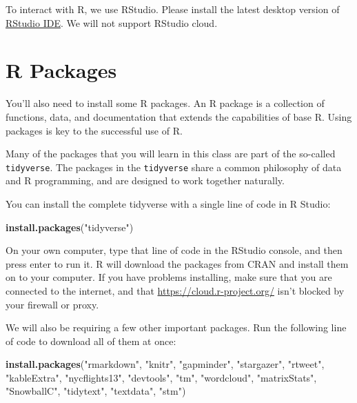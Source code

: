 \documentclass[]{book}
\newenvironment{Shaded}{\begin{snugshade}}{\end{snugshade}}
\newcommand{\KeywordTok}[1]{\textcolor[rgb]{0.13,0.29,0.53}{\textbf{#1}}}
\newcommand{\NormalTok}[1]{#1}
\newcommand{\StringTok}[1]{\textcolor[rgb]{0.31,0.60,0.02}{#1}}
\begin{document}
To interact with R, we use RStudio. Please install the latest desktop version of \href{http://www.rstudio.com/ide/download/desktop}{RStudio IDE}. We will not support RStudio cloud.

\hypertarget{r-packages}{%
\section{R Packages}\label{r-packages}}

You'll also need to install some R packages. An R package is a collection of functions, data, and documentation that extends the capabilities of base R. Using packages is key to the successful use of R.

Many of the packages that you will learn in this class are part of the so-called \texttt{tidyverse}. The packages in the \texttt{tidyverse} share a common philosophy of data and R programming, and are designed to work together naturally.

You can install the complete tidyverse with a single line of code in R Studio:

\begin{Shaded}
\begin{Highlighting}[]
\KeywordTok{install.packages}\NormalTok{(}\StringTok{"tidyverse"}\NormalTok{)}
\end{Highlighting}
\end{Shaded}

On your own computer, type that line of code in the RStudio console, and then press enter to run it. R will download the packages from CRAN and install them on to your computer. If you have problems installing, make sure that you are connected to the internet, and that \url{https://cloud.r-project.org/} isn't blocked by your firewall or proxy.

We will also be requiring a few other important packages. Run the following line of code to download all of them at once:

\begin{Shaded}
\begin{Highlighting}[]
\KeywordTok{install.packages}\NormalTok{(}\StringTok{"rmarkdown"}\NormalTok{, }\StringTok{"knitr"}\NormalTok{, }\StringTok{"gapminder"}\NormalTok{, }
                 \StringTok{"stargazer"}\NormalTok{, }\StringTok{"rtweet"}\NormalTok{, }\StringTok{"kableExtra"}\NormalTok{,}
                 \StringTok{"nycflights13"}\NormalTok{, }\StringTok{"devtools"}\NormalTok{, }\StringTok{"tm"}\NormalTok{, }\StringTok{"wordcloud"}\NormalTok{,}
                 \StringTok{"matrixStats"}\NormalTok{, }\StringTok{"SnowballC"}\NormalTok{, }\StringTok{"tidytext"}\NormalTok{,}
                 \StringTok{"textdata"}\NormalTok{, }\StringTok{"stm"}\NormalTok{)}
\end{Highlighting}
\end{Shaded}
\end{document}
